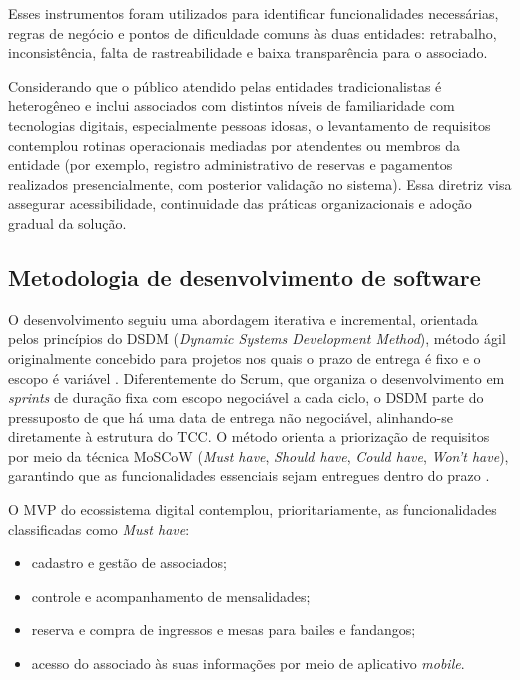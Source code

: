\documentclass[12pt,a4paper]{article}
\begin{document}
Esses instrumentos foram utilizados para identificar funcionalidades necessárias, regras de negócio
e pontos de dificuldade comuns às duas entidades: retrabalho, inconsistência, falta de
rastreabilidade e baixa transparência para o associado.

Considerando que o público atendido pelas entidades tradicionalistas é heterogêneo e inclui
associados com distintos níveis de familiaridade com tecnologias digitais, especialmente pessoas
idosas, o levantamento de requisitos contemplou rotinas operacionais mediadas por atendentes ou
membros da entidade (por exemplo, registro administrativo de reservas e pagamentos realizados
presencialmente, com posterior validação no sistema). Essa diretriz visa assegurar acessibilidade,
continuidade das práticas organizacionais e adoção gradual da solução.

\subsection{Metodologia de desenvolvimento de software}
\label{sec:dsdm}

O desenvolvimento seguiu uma abordagem iterativa e incremental, orientada pelos princípios do DSDM
(\textit{Dynamic Systems Development Method}), método ágil originalmente concebido para projetos nos
quais o prazo de entrega é fixo e o escopo é variável
\parencite{stapleton1997,dsm2014}. Diferentemente do Scrum, que organiza o desenvolvimento em
\textit{sprints} de duração fixa com escopo negociável a cada ciclo, o DSDM parte do pressuposto de
que há uma data de entrega não negociável, alinhando-se diretamente à estrutura do TCC. O método
orienta a priorização de requisitos por meio da técnica MoSCoW (\textit{Must have}, \textit{Should
have}, \textit{Could have}, \textit{Won't have}), garantindo que as funcionalidades essenciais sejam
entregues dentro do prazo \parencite{dsm2014}.

O MVP do ecossistema digital contemplou, prioritariamente, as funcionalidades classificadas como
\textit{Must have}:

\begin{itemize}
  \item cadastro e gestão de associados;
  \item controle e acompanhamento de mensalidades;
  \item reserva e compra de ingressos e mesas para bailes e fandangos;
  \item acesso do associado às suas informações por meio de aplicativo \textit{mobile}.
\end{itemize}
\end{document}
